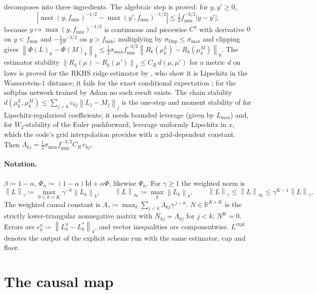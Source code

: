 \documentclass[11pt,a4paper]{article}
\theoremstyle{plain}
\theoremstyle{definition}
\theoremstyle{definition}
\newcommand{\R}{\mathbb{R}}
\newcommand{\norm}[1]{\left\lVert #1 \right\rVert}
\newcommand{\abs}[1]{\left\lvert #1 \right\rvert}
\newcommand{\sigDup}{\sigma_{\mathrm{Dup}}}
\newcommand{\Lev}{L}
\newcommand{\Phimap}{\Phi}
\newcommand{\Phal}{\Phi_\alpha}
\newcommand{\Psal}{\Psi_\alpha}
\newcommand{\Id}{\mathrm{Id}}
\newcommand{\Lmax}{L_{\max}}
\newcommand{\fmin}{f_{\min}}
\newcommand{\Lexpl}{\Lev^{\mathrm{expl}}}
\begin{document}
 decomposes into three ingredients. The algebraic step is proved: for $y, y' \ge 0$,
\[
  \abs{ \max(y, \fmin)^{-1/2} - \max(y', \fmin)^{-1/2} } \le \tfrac12 \fmin^{-3/2} \abs{y - y'},
\]
because $y \mapsto \max(y, \fmin)^{-1/2}$ is continuous and piecewise $C^1$ with derivative $0$ on $y < \fmin$ and $-\tfrac12 y^{-3/2}$ on $y > \fmin$; multiplying by $\sigDup \le \sigma_{\max}$ and clipping gives $\norm{\Phimap(\Lev)_k - \Phimap(M)_k}_k \le \tfrac12 \sigma_{\max} \fmin^{-3/2} \norm{R_k(\mu^{\Lev}_k) - R_k(\mu^{M}_k)}_k$. The estimator stability $\norm{R_k(\mu) - R_k(\mu')}_k \le C_R\, d(\mu, \mu')$ for a metric $d$ on laws is proved for the RKHS ridge estimator by \citet{bayer2022rkhs}, who show it is Lipschitz in the Wasserstein-$1$ distance; it fails for the exact conditional expectation \citep{djete2022}; for the softplus network trained by Adam no such result exists. The chain stability $d(\mu^{\Lev}_k, \mu^{M}_k) \le \sum_{j < k} c_{kj} \norm{\Lev_j - M_j}_j$ is the one-step and moment stability of \citet{reisinger2023} for Lipschitz-regularised coefficients; it needs bounded leverage (given by $\Lmax$) and, for $W_2$-stability of the Euler pushforward, leverage uniformly Lipschitz in $x$, which the code's grid interpolation provides with a grid-dependent constant. Then $\Lambda_{kj} = \tfrac12 \sigma_{\max} \fmin^{-3/2} C_R\, c_{kj}$.

\paragraph{Notation.} $\beta \coloneqq 1 - \alpha$, $\Phal \coloneqq (1-\alpha)\Id + \alpha \Phimap$, likewise $\Psal$. For $\gamma \ge 1$ the weighted norm is
\[
  \norm{\Lev}_\gamma \coloneqq \max_{0 \le k < K} \gamma^{-k} \norm{\Lev_k}_k,
  \qquad \norm{\Lev}_\infty \coloneqq \max_k \norm{\Lev_k}_k,
  \qquad \norm{\Lev}_\gamma \le \norm{\Lev}_\infty \le \gamma^{K-1} \norm{\Lev}_\gamma .
\]
The weighted causal constant is $\Lambda_\gamma \coloneqq \max_k \sum_{j < k} \Lambda_{kj} \gamma^{\,j - k}$. $N \in \R^{K \times K}$ is the strictly lower-triangular nonnegative matrix with $N_{kj} = \Lambda_{kj}$ for $j < k$; $N^K = 0$. Errors are $e^n_k \coloneqq \norm{\Lev^n_k - \Lev^*_k}_k$, and vector inequalities are componentwise. $\Lexpl$ denotes the output of the explicit scheme run with the same estimator, cap and floor.

\section{The causal map}\label{sec:causal}
\end{document}
